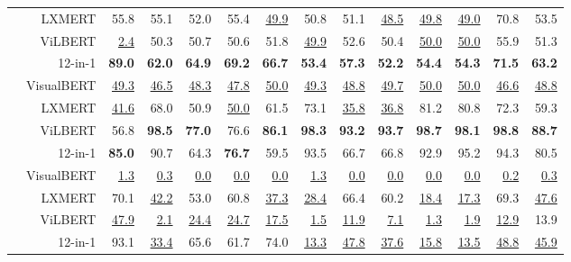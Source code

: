 \documentclass[11pt]{article}
\newcommand\redtable[1]{\underline{#1}}
\begin{document}
\begin{table*}[t!]
{\begin{tabular}{ l r r@{\hskip 0.2in}r@{\hskip 0.2in}rrr@{\hskip 0.2in}r@{\hskip 0.2in}rr@{\hskip 0.2in}rr@{\hskip 0.2in}r@{\hskip 0.2in}r }
        \cmidrule{2-14}
        \multirow{4}{*}{}
        & \multirow{1}{*}{LXMERT} & 55.8 & 55.1 & 52.0 & 55.4 & \redtable{49.9} & 50.8 & 51.1 & \redtable{48.5} & \redtable{49.8} & \redtable{49.0} & 70.8 & 53.5 \\
        & \multirow{1}{*}{ViLBERT} & \redtable{2.4} & 50.3 & 50.7 & 50.6 & 51.8 & \redtable{49.9} & 52.6 & 50.4 & \redtable{50.0} & \redtable{50.0} & 55.9 & 51.3 \\
        & \multirow{1}{*}{12-in-1} & {\bf 89.0} & {\bf 62.0} & {\bf 64.9} & {\bf 69.2} & {\bf 66.7} & {\bf 53.4} & {\bf 57.3} & {\bf 52.2} & {\bf 54.4} & {\bf 54.3} & {\bf 71.5} & {\bf 63.2} \\
        & \multirow{1}{*}{VisualBERT} & \redtable{49.3} & \redtable{46.5} & \redtable{48.3} & \redtable{47.8} & \redtable{50.0} & \redtable{49.3} & \redtable{48.8} & \redtable{49.7} & \redtable{50.0} & \redtable{50.0} & \redtable{46.6} & \redtable{48.8} \\
        \cmidrule{2-14}
\cmidrule{2-14}
        \multirow{4}{*}{}
        & \multirow{1}{*}{LXMERT} & \redtable{41.6}  & 68.0 & 50.9 & \redtable{50.0} & 61.5 & 73.1 & \redtable{35.8} & \redtable{36.8} & 81.2 & 80.8 & 72.3 & 59.3 \\
        & \multirow{1}{*}{ViLBERT} & 56.8 & {\bf 98.5} & {\bf 77.0} & 76.6 & {\bf 86.1} & {\bf 98.3} & {\bf 93.2} & {\bf 93.7} & {\bf 98.7} & {\bf 98.1} & {\bf 98.8} & {\bf 88.7} \\
        & \multirow{1}{*}{12-in-1} & {\bf 85.0} & 90.7 & 64.3 & {\bf 76.7} & 59.5 & 93.5 & 66.7 & 66.8 & 92.9 & 95.2 & 94.3 & 80.5 \\
        & \multirow{1}{*}{VisualBERT} & \redtable{1.3}  & \redtable{0.3} & \redtable{0.0} & \redtable{0.0} & \redtable{0.0} & \redtable{1.3} & \redtable{0.0} & \redtable{0.0} & \redtable{0.0} & \redtable{0.0} & \redtable{0.2} & \redtable{0.3} \\
        \cmidrule{2-14}
        \multirow{4}{*}{}
        & \multirow{1}{*}{LXMERT} & 70.1 & \redtable{42.2} & 53.0 & 60.8 & \redtable{37.3} & \redtable{28.4} & 66.4 & 60.2 & \redtable{18.4} & \redtable{17.3} & 69.3 & \redtable{47.6} \\
        & \multirow{1}{*}{ViLBERT} & \redtable{47.9} & \redtable{2.1} & \redtable{24.4} & \redtable{24.7} & \redtable{17.5} & \redtable{1.5} & \redtable{11.9} & \redtable{7.1} & \redtable{1.3} & \redtable{1.9} & \redtable{12.9} & 13.9 \\
        & \multirow{1}{*}{12-in-1} & 93.1 & \redtable{33.4} & 65.6 & 61.7 & 74.0 & \redtable{13.3} & \redtable{47.8} & \redtable{37.6} & \redtable{15.8} & \redtable{13.5} & \redtable{48.8} & \redtable{45.9} \\

\end{tabular}}
\end{table*}
\end{document}
